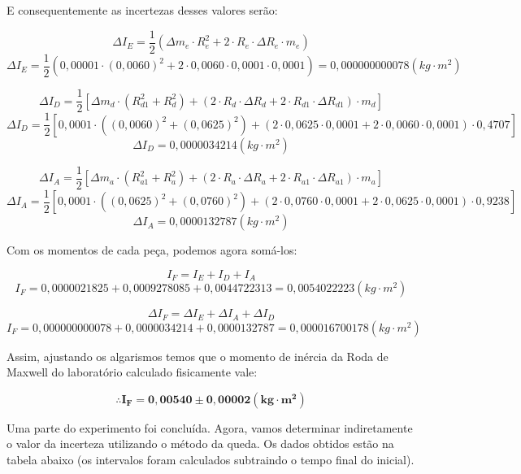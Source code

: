E consequentemente as incertezas desses valores serão:

\[\Delta I_E = \frac{1}{2} \left( \Delta m_e \cdot R_e^2 + 2 \cdot R_e \cdot \Delta R_e \cdot m_e \right)\]
\[\Delta I_E = \frac{1}{2} \left( 0,00001 \cdot (0,0060)^2 + 2 \cdot 0,0060 \cdot 0,0001 \cdot 0,0001 \right) = 0,000000000078 (kg \cdot m^2)\]

\[\Delta I_D = \frac{1}{2} 
    \left[ 
        \Delta m_d \cdot (R_{d1}^2 + R_d^2) + 
        \left( 2 \cdot R_d \cdot \Delta R_d + 2 \cdot R_{d1} \cdot \Delta R_{d1} \right) \cdot m_d
    \right]
\]
\[\Delta I_D = \frac{1}{2} 
    \left[ 
        0,0001 \cdot ((0,0060)^2 + (0,0625)^2) + 
        \left( 2 \cdot 0,0625 \cdot 0,0001 + 2 \cdot 0,0060 \cdot 0,0001 \right) \cdot 0,4707
    \right]
\]
\[\Delta I_D = 0,0000034214 (kg \cdot m^2)\]

\[\Delta I_A = \frac{1}{2} 
    \left[ 
        \Delta m_a \cdot (R_{a1}^2 + R_a^2) + 
        \left( 2 \cdot R_a \cdot \Delta R_a + 2 \cdot R_{a1} \cdot \Delta R_{a1} \right) \cdot m_a
    \right]
\]
\[\Delta I_A = \frac{1}{2} 
    \left[ 
        0,0001 \cdot ((0,0625)^2 + (0,0760)^2) + 
        \left( 2 \cdot 0,0760 \cdot 0,0001 + 2 \cdot 0,0625 \cdot 0,0001 \right) \cdot 0,9238
    \right]
\]
\[\Delta I_A = 0,0000132787 (kg \cdot m^2)\]

Com os momentos de cada peça, podemos agora somá-los:

\[I_F = I_E + I_D + I_A\]
\[I_F = 0,0000021825 + 0,0009278085 + 0,0044722313 = 0,0054022223 (kg \cdot m^2)\]

\[\Delta I_F = \Delta I_E + \Delta I_A + \Delta I_D\]
\[I_F = 0,000000000078 + 0,0000034214 + 0,0000132787 = 0,000016700178 (kg \cdot m^2)\]

Assim, ajustando os algarismos temos que o momento de inércia da Roda de Maxwell do laboratório calculado fisicamente vale:

\[\therefore \mathbf{I_F = 0,00540 \pm 0,00002 (kg \cdot m^2)}\]

Uma parte do experimento foi concluída. Agora, vamos determinar indiretamente o valor da incerteza utilizando o método da queda. Os dados obtidos estão na tabela abaixo (os intervalos foram calculados subtraindo o tempo final do inicial).

